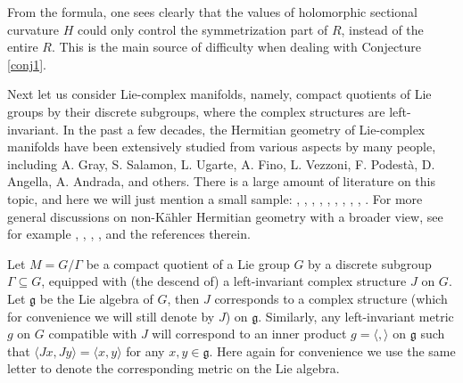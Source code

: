 \documentclass{amsart}
\begin{document}
From the formula, one sees clearly that the values of holomorphic sectional curvature $H$ could only control the symmetrization part of $R$, instead of the entire $R$. This is the main source of difficulty when dealing with Conjecture \ref{conj1}. 

Next let us consider Lie-complex manifolds, namely, compact quotients of Lie groups by their discrete  subgroups, where the complex structures are left-invariant. In the past a few decades, the Hermitian geometry of Lie-complex manifolds have been extensively studied from various aspects by many people, including A. Gray, S. Salamon, L. Ugarte, A. Fino, L. Vezzoni, F. Podest\`a, D. Angella, A. Andrada, and others. There is a large amount of literature on this topic, and here we will just mention a small sample: \cite{AU}, \cite{CFGU},  \cite{FP3}, \cite{FinoTomassini09},  \cite{GiustiPodesta}, \cite{Salamon}, \cite{Ugarte}, \cite{WYZ}, \cite{ZZ-Crelle}, \cite{ZZ-JGP}. For more general discussions on non-K\"ahler Hermitian geometry with a broader view, see for example \cite{AI}, \cite{AT}, \cite{Fu}, \cite{STW}, \cite{Tosatti} and the references therein.

Let $M=G/\Gamma$ be a compact quotient of a Lie group $G$ by a discrete subgroup $\Gamma \subseteq G$, equipped with (the descend of) a left-invariant complex structure $J$ on $G$.  Let ${\mathfrak g}$ be the Lie algebra of $G$, then $J$ corresponds to a complex structure (which for convenience we will still denote by $J$) on  ${\mathfrak g}$. Similarly, any left-invariant metric $g$ on $G$ compatible with $J$ will correspond to an inner product $g=\langle , \rangle$ on ${\mathfrak g}$ such that $\langle Jx,Jy\rangle = \langle x,y\rangle$ for any $x,y\in {\mathfrak g }$. Here again for convenience we use the same letter to denote the corresponding metric on the Lie algebra. 
\end{document}
